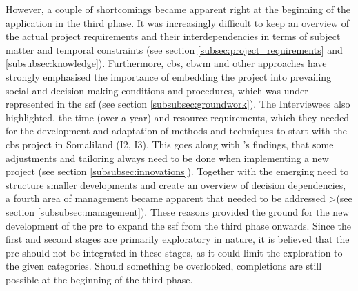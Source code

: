 However, a couple of shortcomings became apparent right at the beginning of the application in the third phase. It was increasingly difficult to keep an overview of the actual project requirements and their interdependencies in terms of subject matter and temporal constraints (see section \ref{subsec:project_requirements} and \ref{subsubsec:knowledge}). Furthermore, \acrshort{cbs}, \acrshort{cbwm} and other approaches have strongly emphasised the importance of embedding the project into prevailing social and decision-making conditions and procedures, which was under-represented in the \acrshort{ssf} (see section \ref{subsubsec:groundwork}). The Interviewees also highlighted, the time (over a year) and resource requirements, which they needed for the development and adaptation of methods and techniques to start with the \acrshort{cbs} project in Somaliland (I2, I3). This goes along with \autocite{garciaFindingWhatYou2021}'s findings, that some adjustments and tailoring always need to be done when implementing a new project (see section \ref{subsubsec:innovations}). Together with the emerging need to structure smaller developments and create an overview of decision dependencies, a fourth area of management became apparent that needed to be addressed >(see section \ref{subsubsec:management}). These reasons provided the ground for the new development of the \acrlong{prc} to expand the \acrshort{ssf} from the third phase onwards. Since the first and second stages are primarily exploratory in nature, it is believed that the \acrshort{prc} should not be integrated in these stages, as it could limit the exploration to the given categories. Should something be overlooked, completions are still possible at the beginning of the third phase.\newline
